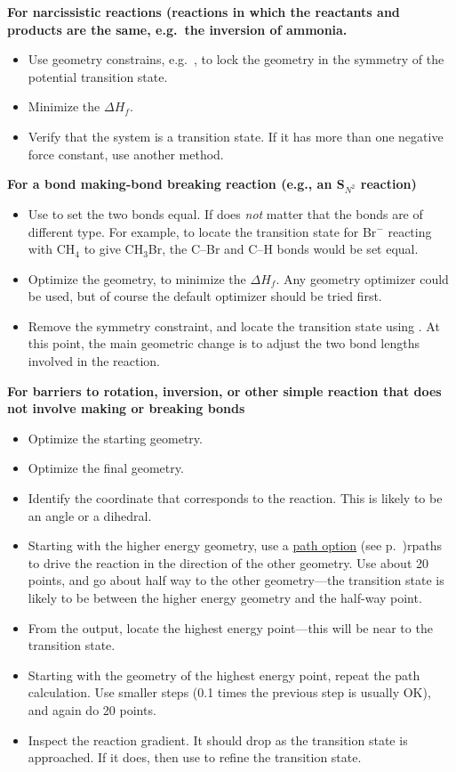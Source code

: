 {\bf For narcissistic reactions (reactions in which the reactants and 
products are the same, e.g.\ the inversion of ammonia.}
\begin{itemize}
\item Use  geometry constrains, e.g.\ , to lock the geometry in
the symmetry of the potential transition state.
\item Minimize the $\Delta H_f$.
\item Verify that the system is a transition state.  If it has more than one 
negative force constant, use another method.
\end{itemize}

{\bf For a bond making-bond breaking reaction (e.g., an S$_{N^2}$ reaction)}
\begin{itemize}
\item  Use  to set the two bonds equal.  If does {\em not} 
matter that the bonds are of different type. For example, to locate the
transition  state for Br$^-$ reacting with CH$_4$ to give CH$_3$Br, the C--Br
and C--H bonds  would be set equal.
\item  Optimize the geometry, to minimize the $\Delta H_f$.  Any geometry
optimizer could be used, but of course the default optimizer should be tried
first.
\item Remove the symmetry constraint, and locate the transition state using
.
At this point, the main geometric change is to adjust the two bond lengths
involved in the reaction.
\end{itemize}

{\bf For barriers to rotation, inversion, or other simple reaction that 
does not involve making or breaking bonds}
\begin{itemize}
\item Optimize the starting geometry.
\item Optimize the final geometry.
\item Identify the coordinate that corresponds to the reaction. This is likely
to be an angle or a dihedral.
\item Starting with the higher energy geometry, use a \hyperref[pageref]{path option}{ (see 
p.~}{)}{rpaths} to drive the reaction in the direction of the other
geometry.   Use about 20 points, and go about half way to the other
geometry---the transition state is likely to be between the higher energy
geometry and the half-way point.
\item From the output, locate the highest energy point---this will be near to
the transition state.
\item Starting with the geometry of the highest energy point, repeat the path 
calculation.  Use smaller steps (0.1 times the previous step is usually OK),
and again do 20 points.
\item Inspect the reaction gradient.  It should drop as the transition state is
approached.  If it does, then use  to refine the transition state.
\end{itemize}

